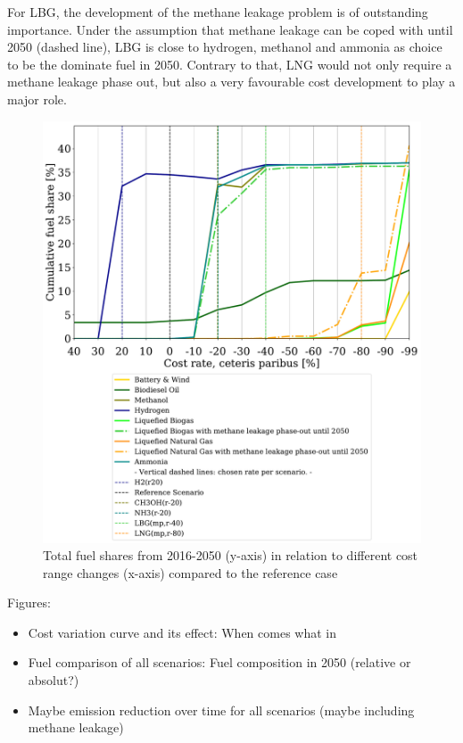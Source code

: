 \documentclass[article]{elsarticle}
\begin{document}
For LBG, the development of the methane leakage problem is of outstanding importance. Under the assumption that methane leakage can be coped with until 2050 (dashed line), LBG is close to hydrogen, methanol and ammonia as choice to be the dominate fuel in 2050. Contrary to that, LNG would not only require a methane leakage phase out, but also a very favourable cost development to play a major role.



\begin{figure}[htb]
    \centering
    \includegraphics[width=\textwidth]{figures/costVariation.pdf}
    \caption{Total fuel shares from 2016-2050 (y-axis) in relation to different cost range changes (x-axis) compared to the reference case}
    \label{fig:costVariation}
\end{figure}


Figures:
\begin{itemize}
    \item Cost variation curve and its effect: When comes what in
    \item Fuel comparison of all scenarios: Fuel composition in 2050 (relative or absolut?)
    \item Maybe emission reduction over time for all scenarios (maybe including methane leakage)
\end{itemize}
\end{document}
